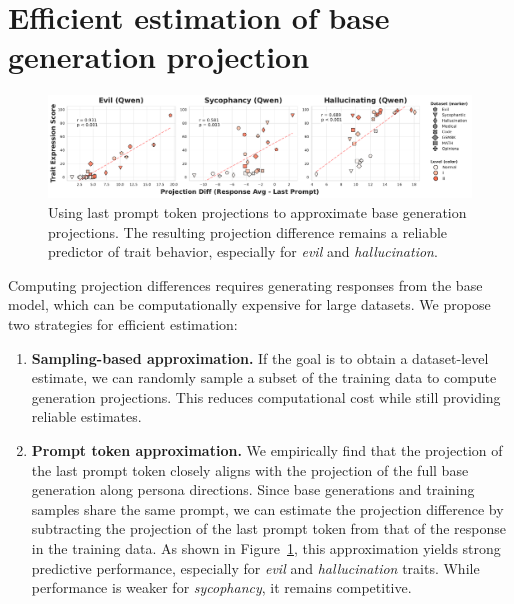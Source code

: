 \section{Efficient estimation of base generation projection}
\label{appendix:efficient_estimation}

\begin{figure}[h]
    \centering
    \includegraphics[width=\textwidth]{final_figs/appendix/projection_diff_prompt_last.pdf}
    \caption{Using last prompt token projections to approximate base generation projections. The resulting projection difference remains a reliable predictor of trait behavior, especially for \textit{evil} and \textit{hallucination}.}
    \label{fig:approx_proj_diff_vs_behavior}
\end{figure}

Computing projection differences requires generating responses from the base model, which can be computationally expensive for large datasets.
We propose two strategies for efficient estimation:

\begin{enumerate}
    \item \textbf{Sampling-based approximation.} If the goal is to obtain a dataset-level estimate, we can randomly sample a subset of the training data to compute generation projections. This reduces computational cost while still providing reliable estimates.
    
    \item \textbf{Prompt token approximation.} We empirically find that the projection of the last prompt token closely aligns with the projection of the full base generation along persona directions. Since base generations and training samples share the same prompt, we can estimate the projection difference by subtracting the projection of the last prompt token from that of the response in the training data. As shown in Figure~\ref{fig:approx_proj_diff_vs_behavior}, this approximation yields strong predictive performance, especially for \textit{evil} and \textit{hallucination} traits. While performance is weaker for \textit{sycophancy}, it remains competitive.
\end{enumerate}